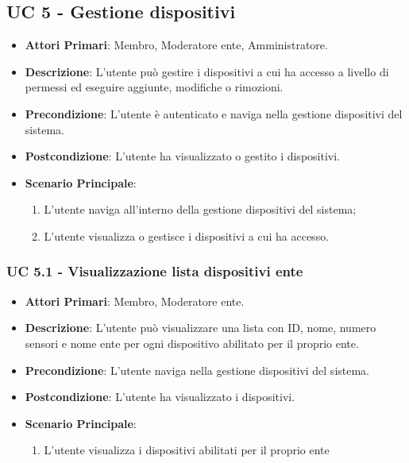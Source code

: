 	\subsection{UC 5 - Gestione dispositivi}
		
		\begin{itemize}
			\item \textbf{Attori Primari}: Membro, Moderatore ente, Amministratore.
			\item \textbf{Descrizione}: L'utente può gestire i dispositivi a cui ha accesso a livello di permessi ed eseguire aggiunte, modifiche o rimozioni.
			\item \textbf{Precondizione}: L'utente è autenticato e naviga nella gestione dispositivi del sistema.
			\item \textbf{Postcondizione}: L'utente ha visualizzato o gestito i dispositivi.
			\item \textbf{Scenario Principale}:
			\begin{enumerate}
				\item{L'utente naviga all'interno della gestione dispositivi del sistema;}
				\item{L'utente visualizza o gestisce i dispositivi a cui ha accesso.}
			\end{enumerate}
		\end{itemize}
			
			
			\subsubsection{UC 5.1 - Visualizzazione lista dispositivi ente}
			\begin{itemize}
				\item \textbf{Attori Primari}: Membro, Moderatore ente.
				\item \textbf{Descrizione}: L'utente può visualizzare una lista con ID, nome, numero sensori e nome ente per ogni dispositivo abilitato per il proprio ente.
				\item \textbf{Precondizione}: L'utente naviga nella gestione dispositivi del sistema.
				\item \textbf{Postcondizione}: L'utente ha visualizzato i dispositivi.
				\item \textbf{Scenario Principale}:
				\begin{enumerate}
					\item{L'utente visualizza i dispositivi abilitati per il proprio ente}
				\end{enumerate}
			\end{itemize}
			

